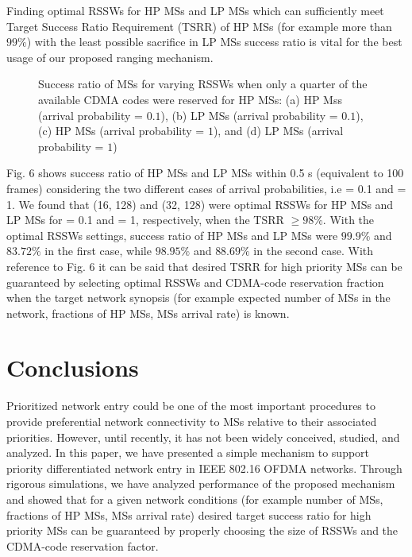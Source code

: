 \documentclass[preprint,12pt]{elsarticle}
\begin{document}
Finding optimal RSSWs for HP MSs and LP MSs which can sufficiently meet Target Success Ratio Requirement (TSRR) of HP MSs (for example more than $99\%$) with the least possible sacrifice in LP MSs success ratio is vital for the best usage of our proposed ranging mechanism.

\begin{figure}[h]
\centering
{}
\caption{Success ratio of MSs for varying RSSWs when only a quarter of the available CDMA codes were reserved for HP MSs: (a) HP Mss (arrival probability = $0.1$), (b) LP MSs (arrival probability = $0.1$), (c) HP MSs (arrival probability = $1$), and (d) LP MSs (arrival probability = $1$)}
\end{figure}

Fig. 6 shows success ratio of HP MSs and LP MSs within 0.5 s (equivalent to 100 frames) considering the two different cases of arrival probabilities, i.e  = 0.1 and  = 1. We found that (16, 128) and (32, 128) were optimal RSSWs for HP MSs and LP MSs for  = 0.1 and  = 1, respectively, when the TSRR $\ge 98\%$. With the optimal RSSWs settings, success ratio of HP MSs and LP MSs were $99.9\%$ and $83.72\%$ in the first case, while $98.95\%$ and $88.69\%$ in the second case. With reference to Fig. 6 it can be said that desired TSRR for high priority MSs can be guaranteed by selecting optimal RSSWs and CDMA-code reservation fraction when the target network synopsis (for example expected number of MSs in the network, fractions of HP MSs, MSs arrival rate) is known.


\section{Conclusions}
Prioritized network entry could be one of the most important procedures to provide preferential network connectivity to MSs relative to their associated priorities. However, until recently, it has not been widely conceived, studied, and analyzed. In this paper, we have presented a simple mechanism to support priority differentiated network entry in IEEE 802.16 OFDMA networks. Through rigorous simulations, we have analyzed performance of the proposed mechanism and showed that for a given network conditions (for example number of MSs, fractions of HP MSs, MSs arrival rate) desired target success ratio for high priority MSs can be guaranteed by properly choosing the size of RSSWs and the CDMA-code reservation factor.
\end{document}
